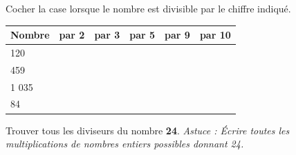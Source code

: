 \documentclass[a4paper]{book}
\begin{document}
   
    \begin{exercice}
        Cocher la case lorsque le nombre est divisible par le chiffre indiqué.
        
        \renewcommand{\arraystretch}{2}
        \begin{center}
            \begin{tabular}{|l|c|c|c|c|c|}
            \hline
            Nombre & par 2 & par 3 & par 5 & par 9 & par 10 \\ \hline
            120    &       &       &       &       &        \\ \hline
            459    &       &       &       &       &        \\ \hline
            1 035  &       &       &       &       &        \\ \hline
            84     &       &       &       &       &        \\ \hline
            \end{tabular}
        \end{center}
    \end{exercice}
    

    \begin{exercice}
        Trouver tous les diviseurs du nombre \textbf{24}. \textit{Astuce : Écrire toutes les multiplications de nombres entiers possibles donnant 24.}  \\

        \dotfill 
        
        \dotfill
    \end{exercice}
\end{document}
